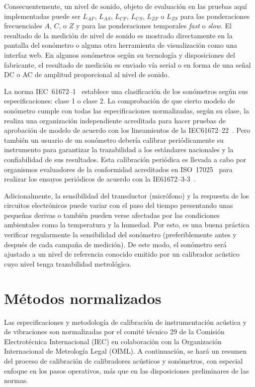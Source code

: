 Consecuentemente, un nivel de sonido, objeto de evaluación en las pruebas aquí implementadas puede ser $L_{AF}$, $L_{AS}$, $L_{CF}$, $L_{CS}$, $L_{ZF}$ o $L_{ZS}$ para las ponderaciones frecuenciales $A$, $C$, o $Z$ y para las ponderaciones temporales \emph{fast} o \emph{slow}.
El resultado de la medición de nivel de sonido es mostrado directamente en la pantalla del sonómetro o alguna otra herramienta de visualización como una interfaz web.
En algunos sonómetros según su tecnología y disposiciones del fabricante, el resultado de medición es enviado vía serial o en forma de una señal DC o AC de amplitud proporcional al nivel de sonido.

La norma \mbox{IEC 61672--1}~\citeyearpar{IEC_TC29_2013_1} establece una clasificación de los sonómetros según sus especificaciones: clase 1 o clase 2.
La comprobación de que cierto modelo de sonómetro cumple con todas las especificaciones normalizadas, según su clase, la realiza una organización independiente acreditada para hacer pruebas de aprobación de modelo de acuerdo con los lineamientos de la \mbox{IEC61672--22}~\citeyearpar{IEC_TC29_2013_2}.
Pero también un usuario de un sonómetro debería calibrar periódicamente su instrumento para garantizar la trazabilidad a los estándares nacionales y la confiabilidad de sus resultados.
Esta calibración periódica es llevada a cabo por organismos evaluadores de la conformidad acreditados en \mbox{ISO 17025}~\citeyearpar{ISO_CASCO_2017} para realizar los ensayos periódicos de acuerdo con la \mbox{IE61672--3-3}~\citeyearpar{IEC_TC29_2013_3}.

Adicionalmente, la sensibilidad del transductor (micrófono) y la respuesta de los circuitos electrónicos puede variar con el paso del tiempo presentando unas pequeñas derivas o también pueden verse afectadas por las condiciones ambientales como la temperatura y la humedad.
Por esto, es una buena práctica verificar regularmente la sensibilidad del sonómetro (preferiblemente antes y después de cada campaña de medición).
De este modo, el sonómetro será ajustado a un nivel de referencia conocido emitido por un calibrador acústico cuyo nivel tenga trazabilidad metrológica.


\section{Métodos normalizados}

Las especificaciones y metodología de calibración de instrumentación acústica y de vibraciones son normalizadas por el comité técnico 29 de la Comisión Electrotécnica Internacional (IEC) en colaboración con la Organización Internacional de Metrología Legal (OIML).
A continuación, se hará un resumen del proceso de calibración de calibradores acústicos y sonómetros, con especial enfoque en los pasos operativos, más que en las disposiciones preliminares de las normas.

